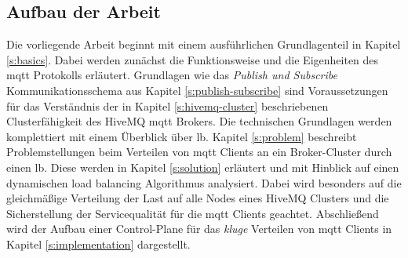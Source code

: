\subsection{Aufbau der Arbeit}
Die vorliegende Arbeit beginnt mit einem ausführlichen Grundlagenteil in Kapitel \ref{s:basics}. Dabei werden zunächst die Funktionsweise und die Eigenheiten des \ac{mqtt} Protokolls erläutert.
Grundlagen wie das \textit{Publish und Subscribe} Kommunikationsschema aus Kapitel \ref{s:publish-subscribe} sind Voraussetzungen für das Verständnis der in Kapitel \ref{s:hivemq-cluster} beschriebenen Clusterfähigkeit des HiveMQ \acs{mqtt} Brokers.
Die technischen Grundlagen werden komplettiert mit einem Überblick über \acl{lb}.
Kapitel \ref{s:problem} beschreibt Problemstellungen beim Verteilen von \ac{mqtt} Clients an ein Broker-Cluster durch einen \acl{lb}.
Diese werden in Kapitel \ref{s:solution} erläutert und mit Hinblick auf einen dynamischen load balancing Algorithmus analysiert. Dabei wird besonders auf die gleichmä{\ss}ige Verteilung der Last auf alle Nodes eines HiveMQ Clusters und die Sicherstellung der Servicequalität für die \ac{mqtt} Clients geachtet.
Abschlie{\ss}end wird der Aufbau einer Control-Plane für das \textit{kluge} Verteilen von \ac{mqtt} Clients in Kapitel \ref{s:implementation} dargestellt.

\newpage
